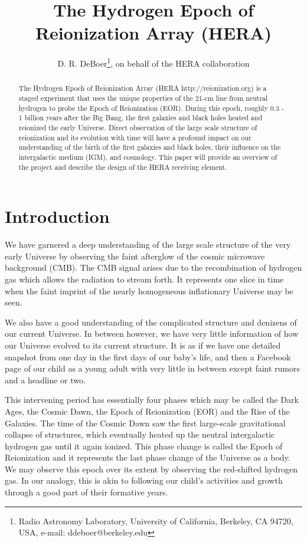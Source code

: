 \documentclass{ICEAA-IEEE_APWC}
\title{The Hydrogen Epoch of Reionization Array (HERA)}
\author{D. R. DeBoer\thanks{Radio Astronomy Laboratory, University of California, Berkeley, CA 94720, USA, e-mail: ddeboer@berkeley.edu}, 
on behalf of the HERA collaboration
}
\begin{document}
\maketitle


\begin{abstract}
The Hydrogen Epoch of Reionization Array (HERA http://reionization.org) is a staged experiment that uses the unique properties of the 21-cm line from neutral hydrogen to probe the Epoch of Reionization (EOR). During this epoch, roughly 0.3 - 1 billion years after the Big Bang, the first galaxies and black holes heated and reionized the early Universe. Direct observation of the large scale structure of reionization and its evolution with time will have a profound impact on our understanding of the birth of the first galaxies and black holes, their influence on the intergalactic medium (IGM), and cosmology.  This paper will provide an overview of the project and describe the design of the HERA receiving element.

\end{abstract}

\section{Introduction}
\label{sec:intro}
We have garnered a deep understanding of the large scale structure of the very early Universe by observing the faint afterglow of the cosmic microwave background (CMB).  The CMB signal arises due to the recombination of hydrogen gas which allows the radiation to stream forth.  It represents one slice in time when the faint imprint of the nearly homogeneous inflationary Universe may be seen.

We also have a good understanding of the complicated structure and denizens of our current Universe.  In between however, we have very little information of how our Universe evolved to its current structure.  It is as if we have one detailed snapshot from one day in the first days of our baby's life, and then a Facebook page of our child as a young adult with very little in between except faint rumors and a headline or two.

This intervening period has essentially four phases which may be called the Dark Ages, the Cosmic Dawn, the Epoch of Reionization (EOR) and the Rise of the Galaxies.  The time of the Cosmic Dawn saw the first large-scale gravitational collapse of structures, which eventually heated up the neutral intergalactic hydrogen gas until it again ionized.  This phase change is called the Epoch of Reionization and it represents the last phase change of the Universe as a body.  We may observe this epoch over its extent by observing the red-shifted hydrogen gas.  In our analogy, this is akin to following our child's activities and growth through a good part of their formative years.
\end{document}
